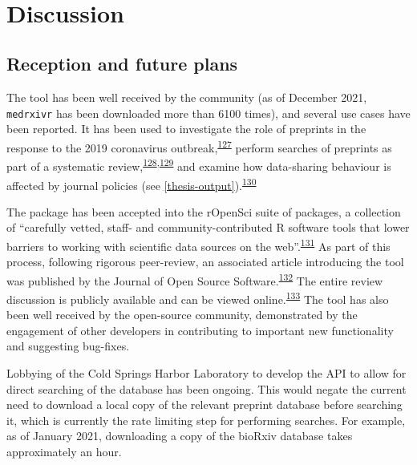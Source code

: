 \documentclass[a4paper, twoside]{templates/ociamthesis}
\begin{document}
~

\hypertarget{discussion}{%
\section{Discussion}\label{discussion}}

\hypertarget{reception-and-future-plans}{%
\subsection{Reception and future plans}\label{reception-and-future-plans}}

The tool has been well received by the community (as of December 2021, \texttt{medrxivr} has been downloaded more than 6100 times), and several use cases have been reported. It has been used to investigate the role of preprints in the response to the 2019 coronavirus outbreak,\textsuperscript{\protect\hyperlink{ref-kodvanj2020}{127}} perform searches of preprints as part of a systematic review,\textsuperscript{\protect\hyperlink{ref-noone2020}{128},\protect\hyperlink{ref-grassly2020}{129}} and examine how data-sharing behaviour is affected by journal policies (see \ref{thesis-output}).\textsuperscript{\protect\hyperlink{ref-mcguinness2020DAScomparison}{130}}

The package has been accepted into the rOpenSci suite of packages, a collection of ``carefully vetted, staff- and community-contributed R software tools that lower barriers to working with scientific data sources on the web''.\textsuperscript{\protect\hyperlink{ref-boettiger2015}{131}} As part of this process, following rigorous peer-review, an associated article introducing the tool was published by the Journal of Open Source Software.\textsuperscript{\protect\hyperlink{ref-mcguinness2020medrxivr}{132}} The entire review discussion is publicly available and can be viewed online.\textsuperscript{\protect\hyperlink{ref-zotero-15016}{133}} The tool has also been well received by the open-source community, demonstrated by the engagement of other developers in contributing to important new functionality and suggesting bug-fixes.

Lobbying of the Cold Springs Harbor Laboratory to develop the API to allow for direct searching of the database has been ongoing. This would negate the current need to download a local copy of the relevant preprint database before searching it, which is currently the rate limiting step for performing searches. For example, as of January 2021, downloading a copy of the bioRxiv database takes approximately an hour.
\end{document}
